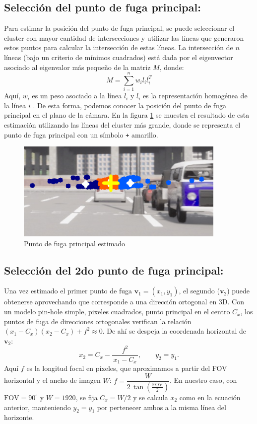 \subsection{Selección del punto de fuga principal:}

Para estimar la posición del punto de fuga principal, se puede seleccionar el cluster con mayor cantidad de intersecciones y
utilizar las líneas que generaron estos puntos para calcular la intersección de estas líneas.
La intersección de $n$ líneas (bajo un criterio de mínimos cuadrados) está dada por
el eigenvector asociado al eigenvalor más pequeño de la matriz $M$, donde:
\[
    M = \sum_{i=1}^{n} w_i l_i l_i^T
\]
Aquí, $w_i$ es un peso asociado a la línea $l_i$ y $l_i$ es la representación homogénea de la línea $i$ \cite{kanatani1998statistical}.
De esta forma, podemos conocer la posición del punto de fuga principal en el plano de la cámara.
En la figura \ref{fig:vanishingPoint} se muestra el resultado de esta estimación utilizando las líneas del cluster más grande, donde se
representa el punto de fuga principal con un símbolo \texttt{+} amarillo.
\begin{figure}[!ht]
    \centering
    \includegraphics[width=0.9\textwidth]{img/reticule/vanishingPoint}
    \caption{Punto de fuga principal estimado}
    \label{fig:vanishingPoint}
\end{figure}

\subsection{Selección del 2do punto de fuga principal:}

Una vez estimado el primer punto de fuga \(\mathbf{v}_1=(x_1,y_1)\), el segundo (\(\mathbf{v}_2\)) puede obtenerse
aprovechando que corresponde a una dirección ortogonal en 3D. Con un modelo pin-hole simple, pixeles cuadrados, punto principal
en el centro \(C_x\), los puntos de fuga de direcciones ortogonales verifican la relación
\( (x_1-C_x)(x_2-C_x) + f^2 \approx 0 \). De ahí se despeja la coordenada horizontal de \(\mathbf{v}_2\):
\begin{equation}
    x_2 = C_x - \frac{f^2}{\,x_1 - C_x\,}, \qquad y_2 = y_1.
\end{equation}
Aquí \(f\) es la longitud focal en píxeles, que aproximamos a partir del FOV horizontal y el ancho de imagen \(W\):
\( f = \dfrac{W}{2\,\tan(\tfrac{\text{FOV}}{2})} \). En nuestro caso, con \(\text{FOV}=90^\circ\) y \(W=1920\), se fija
\(C_x=W/2\) y se calcula \(x_2\) como en la ecuación anterior, manteniendo \(y_2=y_1\) por pertenecer ambos a la misma línea del horizonte.

